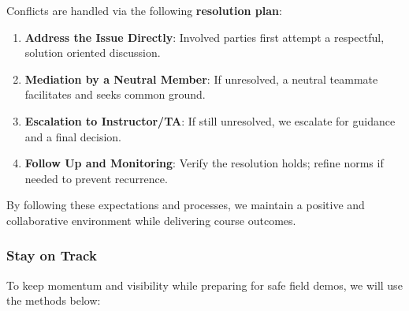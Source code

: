 \documentclass{article}
\begin{document}
\noindent
Conflicts are handled via the following \textbf{resolution plan}:

\begin{enumerate}
  \item \textbf{Address the Issue Directly}: Involved parties first attempt a
        respectful, solution oriented discussion.
  \item \textbf{Mediation by a Neutral Member}: If unresolved, a neutral
        teammate facilitates and seeks common ground.
  \item \textbf{Escalation to Instructor/TA}: If still unresolved, we escalate
        for guidance and a final decision.
  \item \textbf{Follow Up and Monitoring}: Verify the resolution holds; refine
        norms if needed to prevent recurrence.
\end{enumerate}

By following these expectations and processes, we maintain a positive and
collaborative environment while delivering course outcomes.

\subsubsection*{\color{blue}Stay on Track}

To keep momentum and visibility while preparing for safe field demos, we will
use the methods below:
\end{document}
